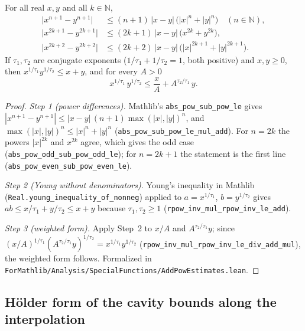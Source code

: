 \begin{lemma}\label{lem:sg-tal:perceptron-power-difference}
  \leanok
{}
For all real $x,y$ and all $k\in\mathbb N$,
\begin{align*}
 \bigl|x^{n+1}-y^{n+1}\bigr| &\le (n+1)\,|x-y|\,\bigl(|x|^{n}+|y|^{n}\bigr)\quad(n\in\mathbb N),\\
 \bigl|x^{2k+1}-y^{2k+1}\bigr| &\le (2k+1)\,|x-y|\,\bigl(x^{2k}+y^{2k}\bigr),\\
 \bigl|x^{2k+2}-y^{2k+2}\bigr| &\le (2k+2)\,|x-y|\,\bigl(|x|^{2k+1}+|y|^{2k+1}\bigr).
\end{align*}
If $\tau_1,\tau_2$ are conjugate exponents ($1/\tau_1+1/\tau_2=1$, both positive) and $x,y\ge 0$, then
$x^{1/\tau_1}y^{1/\tau_2}\le x+y$, and for every $A>0$
\[
 x^{1/\tau_1}\,y^{1/\tau_2}\le \frac{x}{A}+A^{\tau_2/\tau_1}\,y .
\]
\end{lemma}
\begin{proof}
  \leanok
\emph{Step 1 (power differences).} Mathlib's \texttt{abs\_pow\_sub\_pow\_le} gives
$|x^{n+1}-y^{n+1}|\le|x-y|\,(n+1)\max(|x|,|y|)^{n}$, and $\max(|x|,|y|)^n\le|x|^n+|y|^n$
(\texttt{abs\_pow\_sub\_pow\_le\_mul\_add}). For $n=2k$ the powers $|x|^{2k}$ and $x^{2k}$ agree, which
gives the odd case (\texttt{abs\_pow\_odd\_sub\_pow\_odd\_le}); for $n=2k+1$ the statement is the first line
(\texttt{abs\_pow\_even\_sub\_pow\_even\_le}).

\emph{Step 2 (Young without denominators).} Young's inequality in Mathlib
(\texttt{Real.young\_inequality\_of\_nonneg}) applied to $a=x^{1/\tau_1}$, $b=y^{1/\tau_2}$ gives
$ab\le x/\tau_1+y/\tau_2\le x+y$ because $\tau_1,\tau_2\ge1$
(\texttt{rpow\_inv\_mul\_rpow\_inv\_le\_add}).

\emph{Step 3 (weighted form).} Apply Step~2 to $x/A$ and $A^{\tau_2/\tau_1}y$; since
$(x/A)^{1/\tau_1}(A^{\tau_2/\tau_1}y)^{1/\tau_2}=x^{1/\tau_1}y^{1/\tau_2}$
(\texttt{rpow\_inv\_mul\_rpow\_inv\_le\_div\_add\_mul}), the weighted form follows.
Formalized in \texttt{ForMathlib/Analysis/SpecialFunctions/AddPowEstimates.lean}.
\end{proof}

\subsection{H\"older form of the cavity bounds along the interpolation}\label{sub:sg-tal:perceptron-exponential-holder}

